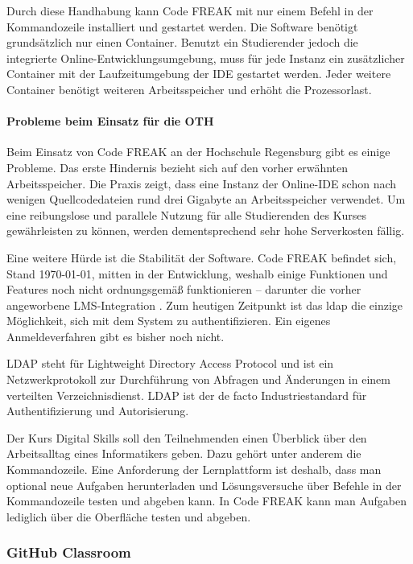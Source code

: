 Durch diese Handhabung kann Code FREAK mit nur einem Befehl in der
Kommandozeile installiert und gestartet werden. Die Software benötigt
grundsätzlich nur einen Container. Benutzt ein Studierender jedoch die
integrierte Online-Entwicklungsumgebung, muss für jede Instanz ein zusätzlicher
Container mit der Laufzeitumgebung der IDE gestartet werden. Jeder weitere
Container benötigt weiteren Arbeitsspeicher und erhöht die Prozessorlast.

\paragraph{Probleme beim Einsatz für die OTH}
Beim Einsatz von Code FREAK an der Hochschule Regensburg gibt es einige
Probleme. Das erste Hindernis bezieht sich auf den vorher erwähnten
Arbeitsspeicher. Die Praxis zeigt, dass eine Instanz der Online-IDE schon nach
wenigen Quellcodedateien rund drei Gigabyte an Arbeitsspeicher verwendet. Um
eine reibungslose und parallele Nutzung für alle Studierenden des Kurses
gewährleisten zu können, werden dementsprechend sehr hohe Serverkosten fällig. 
\parencite{codefreak-memory-problem}

Eine weitere Hürde ist die Stabilität der Software. Code FREAK befindet sich,
Stand \today, mitten in der Entwicklung, weshalb einige Funktionen und Features
noch nicht ordnungsgemäß funktionieren -- darunter die vorher angeworbene
LMS-Integration \parencite{codefreak-docs}. Zum heutigen Zeitpunkt ist das
\ac{ldap} die einzige Möglichkeit, sich mit dem System zu authentifizieren. Ein
eigenes Anmeldeverfahren gibt es bisher noch nicht.

LDAP steht für Lightweight Directory Access Protocol und ist ein
Netzwerkprotokoll zur Durchführung von Abfragen und Änderungen in einem 
verteilten Verzeichnisdienst. LDAP ist der de facto Industriestandard für
Authentifizierung und Autorisierung. \parencite{ldap}

Der Kurs Digital Skills soll den Teilnehmenden einen Überblick über den
Arbeitsalltag eines Informatikers geben. Dazu gehört unter anderem die
Kommandozeile. Eine Anforderung der Lernplattform ist deshalb, dass man
optional neue Aufgaben herunterladen und Lösungsversuche über Befehle in der
Kommandozeile testen und abgeben kann. In Code FREAK kann man Aufgaben lediglich
über die Oberfläche testen und abgeben.

\newpage
\subsubsection{GitHub Classroom}
